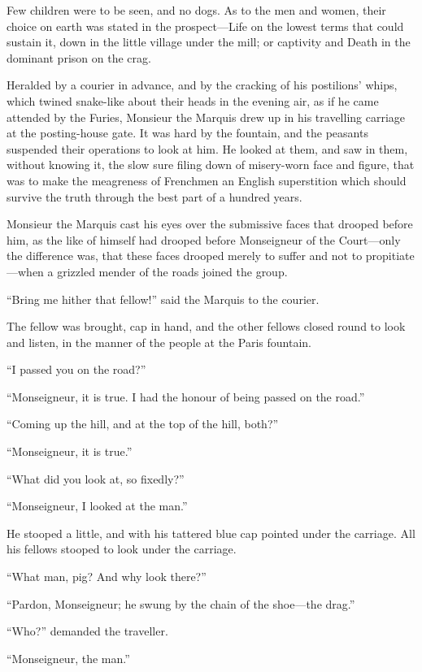 Few children were to be seen, and no dogs.  As to the men and women,
their choice on earth was stated in the prospect---Life on the lowest
terms that could sustain it, down in the little village under the
mill; or captivity and Death in the dominant prison on the crag.

Heralded by a courier in advance, and by the cracking of his
postilions' whips, which twined snake-like about their heads in the
evening air, as if he came attended by the Furies, Monsieur the
Marquis drew up in his travelling carriage at the posting-house gate.
It was hard by the fountain, and the peasants suspended their
operations to look at him.  He looked at them, and saw in them,
without knowing it, the slow sure filing down of misery-worn face and
figure, that was to make the meagreness of Frenchmen an English
superstition which should survive the truth through the best part of
a hundred years.

Monsieur the Marquis cast his eyes over the submissive faces that
drooped before him, as the like of himself had drooped before
Monseigneur of the Court---only the difference was, that these faces
drooped merely to suffer and not to propitiate---when a grizzled
mender of the roads joined the group.

``Bring me hither that fellow!'' said the Marquis to the courier.

The fellow was brought, cap in hand, and the other fellows closed
round to look and listen, in the manner of the people at the Paris
fountain.

``I passed you on the road?''

``Monseigneur, it is true.  I had the honour of being passed on the road.''

``Coming up the hill, and at the top of the hill, both?''

``Monseigneur, it is true.''

``What did you look at, so fixedly?''

``Monseigneur, I looked at the man.''

He stooped a little, and with his tattered blue cap pointed under the
carriage.  All his fellows stooped to look under the carriage.

``What man, pig?  And why look there?''

``Pardon, Monseigneur; he swung by the chain of the shoe---the drag.''

``Who?'' demanded the traveller.

``Monseigneur, the man.''

